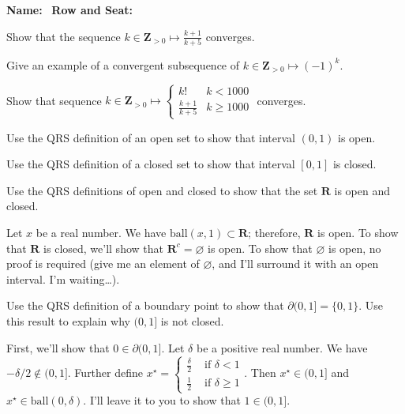 \documentclass[12pt,fleqn]{exam}
\newcommand{\reals}{\mathbf{R}}
\newcommand{\ball}{\mathrm{ball}}
\newcommand{\integers}{\mathbf{Z}}
\begin{document}
\large
\vspace{0.1in}
\noindent{}
{\bf Name:}\hrulefill\
\noindent {}
{\bf Row and Seat:}\hrulefill\

\vspace{0.1in}


\begin{questions}

\question Show that the sequence $k \in \integers_{>0} \mapsto \frac{k+1}{k+5}$ converges.

\question Give an example of a convergent subsequence of $k \in \integers_{>0} \mapsto (-1)^k$.

\question Show that sequence $k \in \integers_{>0} \mapsto \begin{cases}  k!  & k < 1000 \\
\frac{k+1}{k+5} & k \geq 1000 \end{cases} $ converges.

\question  Use the QRS definition of an open set to show that interval \((0,1)\) is open.

\question  Use the QRS definition of a closed set to show that interval \([0,1]\) is closed.

\question   Use the QRS definitions of open and closed to show that the set \(\reals\) is open and closed.

\begin{solution}
Let \(x\) be a real number.  We have \(\ball(x,1) \subset
\reals\); therefore, \(\reals\) is open.  To show that \(\reals\) is
closed, we'll show that \(\reals^c = \varnothing\) is open. To
show that \(\varnothing\) is open, no proof is required (give
me an element of \(\varnothing\), and I'll surround it with an
open interval.  I'm waiting\dots).
 \end{solution}
 
\question   Use the QRS definition of a boundary point to show that \(\partial(0,1] = \{0,1\}\).  Use this
result to explain why \((0,1]\) is not closed.
\begin{solution}
 First, we'll show that \( 0 \in \partial(0,1]
\). Let \(\delta\) be a positive real number.  We have \(-\delta/2
\notin (0,1]\). Further define
\( x^\star = \displaystyle \begin{cases} \frac{\delta}{2} & \mbox{ if } \delta <
  1 \\ \frac{1}{2} & \mbox { if } \delta \geq 1 
   \end{cases} \).  Then \(x^\star \in (0,1]\) and \(x^\star \in
   \ball(0,\delta)\). I'll leave it to you to show that  \(1 \in (0,1]\). 



\end{solution}
\end{questions}
\end{document}
